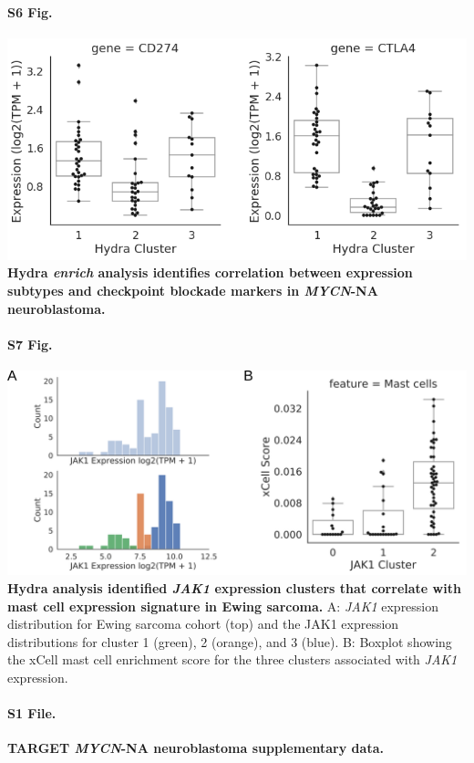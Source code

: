 \documentclass[10pt,letterpaper]{article}
\begin{document}
\paragraph*{S6 Fig.}
\includegraphics[width=\textwidth]{img/PNG/Checkpoint-Plots-V1}
\label{S6_Fig} {\bf Hydra \textit{enrich} analysis identifies correlation between expression subtypes and checkpoint blockade markers in \textit{MYCN}-NA neuroblastoma.}

\paragraph*{S7 Fig.}
\includegraphics[width=\textwidth]{img/PNG/ewing-jak1-expression-fig}
\label{S7_Fig} {\bf Hydra analysis identified \textit{JAK1} expression clusters that correlate with mast cell expression signature in Ewing sarcoma.} A: \textit{JAK1} expression distribution for Ewing sarcoma cohort (top) and the JAK1 expression distributions for cluster 1 (green), 2 (orange), and 3 (blue). B: Boxplot showing the xCell mast cell enrichment score for the three clusters associated with \textit{JAK1} expression.

\paragraph*{S1 File.}
\label{S1_File}
{\bf TARGET \textit{MYCN}-NA neuroblastoma supplementary data.}
\end{document}
